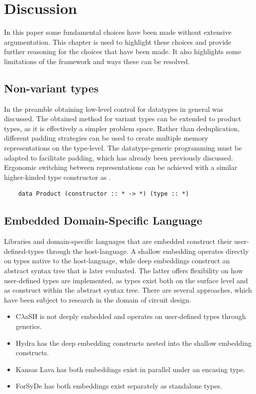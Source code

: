 \documentclass{article}
\newcommand{\type}[1]{\smash{\colorbox{codegray}{\texttt{#1}}}}
\begin{document}
\newpage

\section{Discussion}

In this paper some fundamental choices have been made without extensive argumentation.
This chapter is used to highlight these choices and provide further reasoning for the choices that have been made.
It also highlights some limitations of the framework and ways these can be resolved.

\subsection{Non-variant types}

In the preamble obtaining low-level control for datatypes in general was discussed.
The obtained method for variant types can be extended to product types, as it is effectively a simpler problem space.
Rather than deduplication, different padding strategies can be used to create multiple memory representations on the type-level.
The datatype-generic programming must be adapted to facilitate padding, which has already been previously discussed.
Ergonomic switching between representations can be achieved with a similar higher-kinded type constructor as \type{Variant}.

\begin{verbatim}
    data Product (constructor :: * -> *) (type :: *)
\end{verbatim}


\subsection{Embedded Domain-Specific Language}

Libraries and domain-specific languages that are embedded construct their user-defined-types through the host-language.
A shallow embedding operates directly on types native to the host-language, while deep embeddings construct an abstract syntax tree that is later evaluated.
The latter offers flexibility on how user-defined types are implemented, as types exist both on the surface level and as construct within the abstract syntax tree.   
There are several approaches, which have been subject to research in the domain of circuit design.

\begin{itemize}
    \setlength\itemsep{0em}
    \item {C$\lambda$aSH} is not deeply embedded and operates on user-defined types through generics\cite{clash}. 
    \item Hydra has the deep embedding constructs nested into the shallow embedding constructs\cite{hydra}.
    \item Kansas Lava has both embeddings exist in parallel under an encasing type\cite{kansas-lava}.
    \item ForSyDe has both embeddings exist separately as standalone types\cite{forsyde}.
\end{itemize}
\end{document}

